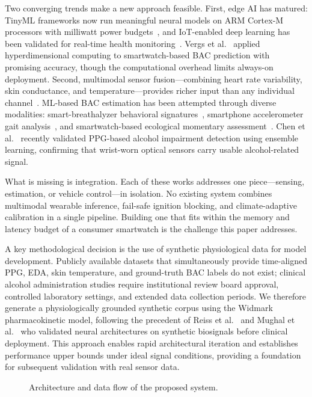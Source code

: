 \documentclass[HARVARD,Times2COL]{WileyNJDv5}
\begin{document}
Two converging trends make a new approach feasible. First, edge AI has matured: TinyML frameworks now run meaningful neural models on ARM Cortex-M processors with milliwatt power budgets~\citep{zhou2025tinyml, abadade2023}, and IoT-enabled deep learning has been validated for real-time health monitoring~\citep{wu2023internet}. Vergs et al.~\citep{verges2024} applied hyperdimensional computing to smartwatch-based BAC prediction with promising accuracy, though the computational overhead limits always-on deployment. Second, multimodal sensor fusion---combining heart rate variability, skin conductance, and temperature---provides richer input than any individual channel~\citep{sensors2024, sensors2023, vedanarayanan2024}. ML-based BAC estimation has been attempted through diverse modalities: smart-breathalyzer behavioral signatures~\citep{gharani2021}, smartphone accelerometer gait analysis~\citep{killian2019}, and smartwatch-based ecological momentary assessment~\citep{alcowatch2025}. Chen et al.~\citep{chen2025} recently validated PPG-based alcohol impairment detection using ensemble learning, confirming that wrist-worn optical sensors carry usable alcohol-related signal.

What is missing is integration. Each of these works addresses one piece---sensing, estimation, or vehicle control---in isolation. No existing system combines multimodal wearable inference, fail-safe ignition blocking, and climate-adaptive calibration in a single pipeline. Building one that fits within the memory and latency budget of a consumer smartwatch is the challenge this paper addresses.

A key methodological decision is the use of synthetic physiological data for model development. Publicly available datasets that simultaneously provide time-aligned PPG, EDA, skin temperature, and ground-truth BAC labels do not exist; clinical alcohol administration studies require institutional review board approval, controlled laboratory settings, and extended data collection periods. We therefore generate a physiologically grounded synthetic corpus using the Widmark pharmacokinetic model, following the precedent of Reiss et al.~\citep{reiss2019} and Mughal et al.~\citep{mughal2025} who validated neural architectures on synthetic biosignals before clinical deployment. This approach enables rapid architectural iteration and establishes performance upper bounds under ideal signal conditions, providing a foundation for subsequent validation with real sensor data.
\par
\begin{figure}[t]
\centering

\caption{Architecture and data flow of the proposed system.}
\label{fig:system}
\end{figure}
\end{document}
